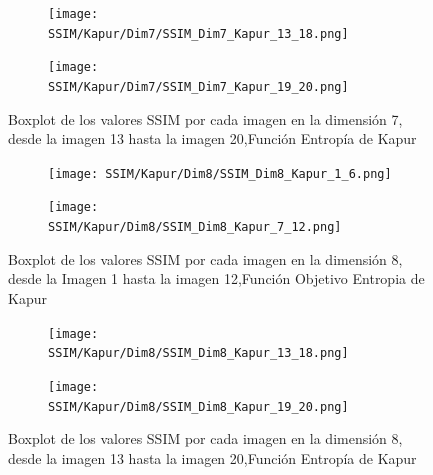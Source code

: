 \documentclass[conference]{IEEEtran}
\begin{document}
\begin{figure}
	\centering
	\begin{subfigure}{0.5\textwidth}
		\texttt{[image: SSIM/Kapur/Dim7/SSIM\_Dim7\_Kapur\_13\_18.png]}
	\end{subfigure}   
	\begin{subfigure}{0.5\textwidth}
		\texttt{[image: SSIM/Kapur/Dim7/SSIM\_Dim7\_Kapur\_19\_20.png]}
		\vspace{-150pt} %
	\end{subfigure}
	\caption{Boxplot de los valores SSIM por cada imagen en la dimensión 7, desde la imagen 13 hasta la imagen 20,Función Entropía de Kapur}
	\label{fig:imagenes}    
\end{figure}

\begin{figure}
	\centering
	
	\begin{subfigure}{0.5\textwidth}
		\texttt{[image: SSIM/Kapur/Dim8/SSIM\_Dim8\_Kapur\_1\_6.png]}
	\end{subfigure}
	
	\begin{subfigure}{0.5\textwidth}
		\texttt{[image: SSIM/Kapur/Dim8/SSIM\_Dim8\_Kapur\_7\_12.png]}
	\end{subfigure}
	\caption{Boxplot de los valores SSIM por cada imagen en la dimensión 8, desde la Imagen 1 hasta la imagen 12,Función Objetivo Entropia de Kapur}
	\label{fig:imagenes}    
\end{figure}

\begin{figure}
	\centering
	\begin{subfigure}{0.5\textwidth}
		\texttt{[image: SSIM/Kapur/Dim8/SSIM\_Dim8\_Kapur\_13\_18.png]}
	\end{subfigure}   
	\begin{subfigure}{0.5\textwidth}
		\texttt{[image: SSIM/Kapur/Dim8/SSIM\_Dim8\_Kapur\_19\_20.png]}
		\vspace{-150pt} %
	\end{subfigure}
	\caption{Boxplot de los valores SSIM por cada imagen en la dimensión 8, desde la imagen 13 hasta la imagen 20,Función Entropía de Kapur}
	\label{fig:imagenes}    
\end{figure}
\end{document}
